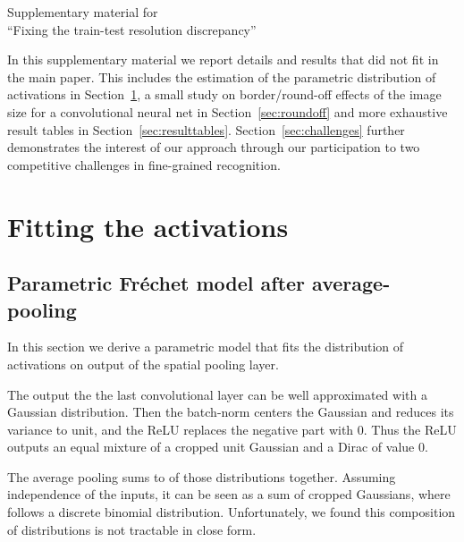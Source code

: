 \appendix 





\onecolumn
\begin{minipage}{\textwidth}
\begin{center}
\Huge
Supplementary material for \\
``Fixing the train-test resolution discrepancy''
\end{center}
\end{minipage}


\vspace*{1cm}


In this supplementary material we report details and results that did not fit in the main paper.
This includes the estimation of the parametric distribution of activations in Section~\ref{sec:parametricfit}, a small study on border/round-off effects of the image size for a convolutional neural net in Section~\ref{sec:roundoff} and more exhaustive result tables in Section~\ref{sec:resulttables}. Section~\ref{sec:challenges} further demonstrates the interest of our approach through our participation to two competitive challenges in fine-grained recognition.




\section{Fitting the activations}
\label{sec:parametricfit}

\subsection{Parametric Fr\'echet model after average-pooling}
In this section we derive a parametric model that fits the distribution of activations on output of the spatial pooling layer. 

The output the the last convolutional layer can be well approximated with a Gaussian distribution. 
Then the batch-norm centers the Gaussian and reduces its variance to unit, and the ReLU replaces the negative part with 0. 
Thus the ReLU outputs an equal mixture of a cropped unit Gaussian and a Dirac of value 0.

The average pooling sums  to  of those distributions together.
Assuming independence of the inputs, it can be seen as a sum of  cropped Gaussians, where  follows a discrete binomial distribution. 
Unfortunately, we found this composition of distributions is not tractable in close form. 

